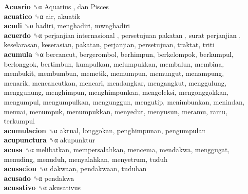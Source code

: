\textbf{Acuario} ␝α   Aquarius ,  dan Pisces   \\
\textbf{acuatico} ␝α  air, akuatik  \\
\textbf{acudi} ␝α  hadiri, menghadiri, mwnghadiri  \\
\textbf{acuerdo} ␝α   perjanjian internasional ,  persetujuan pakatan ,  surat perjanjian , keselarasan, keserasian, pakatan, perjanjian, persetujuan, traktat, triti  \\
\textbf{acumula} ␝α  bercancut, bergerombol, berhimpun, berkelompok, berkumpul, berlonggok, bertimbun, kumpulkan, melumpukkan, membalun, membina, membukit, membumbun, memetik, memumpun, memungut, menampung, menarik, mencancutkan, mencari, mendangkar, mengangkut, menggulung, menggunung, menghimpun, menghimpunkan, mengoleksi, mengonggokkan, mengumpul, mengumpulkan, mengunggun, mengutip, menimbunkan, menindan, menuai, menumpuk, menumpukkan, menyedut, menyusun, meramu, ramu, terkumpul  \\
\textbf{acumulacion} ␝α  akrual, longgokan, penghimpunan, pengumpulan  \\
\textbf{acupunctura} ␝α  akupunktur  \\
\textbf{acusa} ␝α  melibatkan, mempersalahkan, mencema, mendakwa, menggugat, menuding, menuduh, menyalahkan, menyetrum, tuduh  \\
\textbf{acusacion} ␝α  dakwaan, pendakwaan, tuduhan  \\
\textbf{acusado} ␝α  pendakwa  \\
\textbf{acusativo} ␝α  akusativus  \\
